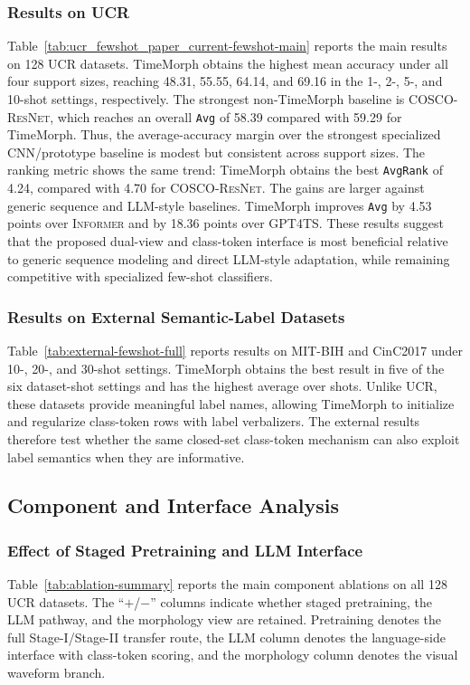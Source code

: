 \documentclass[10pt,journal,compsoc]{IEEEtran}
\begin{document}
\subsubsection{Results on UCR}
Table~\ref{tab:ucr_fewshot_paper_current-fewshot-main} reports the main results on 128 UCR datasets.
TimeMorph obtains the highest mean accuracy under all four support sizes, reaching 48.31, 55.55, 64.14, and 69.16 in the 1-, 2-, 5-, and 10-shot settings, respectively.
The strongest non-TimeMorph baseline is \textsc{COSCO-ResNet}, which reaches an overall \texttt{Avg} of 58.39 compared with 59.29 for TimeMorph.
Thus, the average-accuracy margin over the strongest specialized CNN/prototype baseline is modest but consistent across support sizes.
The ranking metric shows the same trend: TimeMorph obtains the best \texttt{AvgRank} of 4.24, compared with 4.70 for \textsc{COSCO-ResNet}.
The gains are larger against generic sequence and LLM-style baselines.
TimeMorph improves \texttt{Avg} by 4.53 points over \textsc{Informer} and by 18.36 points over \textsc{GPT4TS}.
These results suggest that the proposed dual-view and class-token interface is most beneficial relative to generic sequence modeling and direct LLM-style adaptation, while remaining competitive with specialized few-shot classifiers.


\subsubsection{Results on External Semantic-Label Datasets}
Table~\ref{tab:external-fewshot-full} reports results on MIT-BIH and CinC2017 under 10-, 20-, and 30-shot settings.
TimeMorph obtains the best result in five of the six dataset-shot settings and has the highest average over shots.
Unlike UCR, these datasets provide meaningful label names, allowing TimeMorph to initialize and regularize class-token rows with label verbalizers.
The external results therefore test whether the same closed-set class-token mechanism can also exploit label semantics when they are informative.


\subsection{Component and Interface Analysis}
\subsubsection{Effect of Staged Pretraining and LLM Interface}
Table~\ref{tab:ablation-summary} reports the main component ablations on all 128 UCR datasets.
The ``$+$/$-$'' columns indicate whether staged pretraining, the LLM pathway, and the morphology view are retained.
Pretraining denotes the full Stage-I/Stage-II transfer route, the LLM column denotes the language-side interface with class-token scoring, and the morphology column denotes the visual waveform branch.

\end{document}

